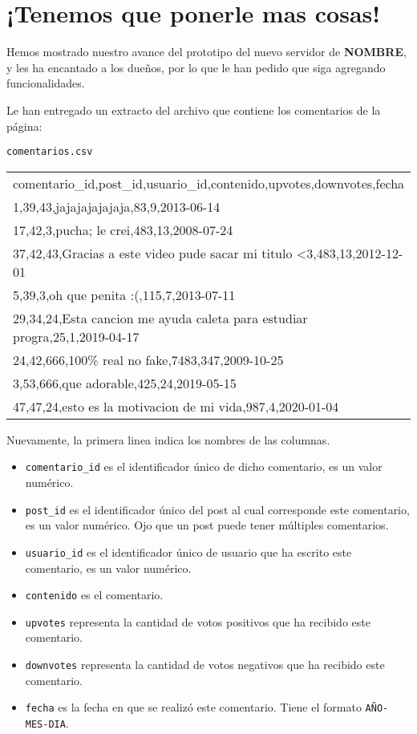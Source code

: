 \section{¡Tenemos que ponerle mas cosas!}

Hemos mostrado nuestro avance del prototipo del nuevo servidor de \textbf{NOMBRE}, y les ha encantado a los dueños, por lo que le han pedido que siga agregando funcionalidades.

Le han entregado un extracto del archivo que contiene los comentarios de la página:
\begin{center}
    \texttt{comentarios.csv} \\
	\begin{tabular}{|l|}
		\hline
comentario\_id,post\_id,usuario\_id,contenido,upvotes,downvotes,fecha\\
1,39,43,jajajajajajaja,83,9,2013-06-14\\
17,42,3,pucha; le crei,483,13,2008-07-24\\
37,42,43,Gracias a este video pude sacar mi titulo <3,483,13,2012-12-01\\
5,39,3,oh que penita :(,115,7,2013-07-11\\
29,34,24,Esta cancion me ayuda caleta para estudiar progra,25,1,2019-04-17\\
24,42,666,100\% real no fake,7483,347,2009-10-25\\
3,53,666,que adorable,425,24,2019-05-15\\
47,47,24,esto es la motivacion de mi vida,987,4,2020-01-04\\
		\hline
	\end{tabular}
\end{center}

Nuevamente, la primera linea indica los nombres de las columnas.

\begin{itemize}
\itemsep0em 
    \item \texttt{comentario\_id} es el identificador único de dicho comentario, es un valor numérico.
    \item \texttt{post\_id} es el identificador único del post al cual corresponde este comentario, es un valor numérico. Ojo que un post puede tener múltiples comentarios.
    \item \texttt{usuario\_id} es el identificador único de usuario que ha escrito este comentario, es un valor numérico.
    \item \texttt{contenido} es el comentario.
    \item \texttt{upvotes} representa la cantidad de votos positivos que ha recibido este comentario.
    \item \texttt{downvotes} representa la cantidad de votos negativos que ha recibido este comentario.
    \item \texttt{fecha} es la fecha en que se realizó este comentario. Tiene el formato \texttt{AÑO-MES-DIA}.
\end{itemize}

